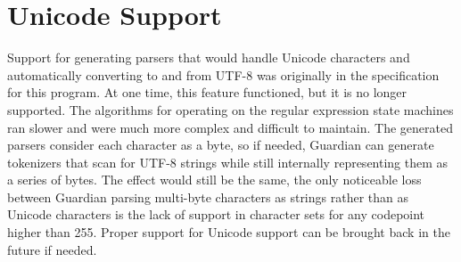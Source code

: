 
\section{Unicode Support}
{
	Support for generating parsers that would
	handle Unicode characters and automatically
	converting to and from UTF-8 was originally in the
	specification for this program.
	At one time, this feature functioned, but it
	is no longer supported.
	The algorithms for operating on the regular expression
	state machines ran slower and were
	much more complex and difficult to maintain.
	The generated parsers consider each
	character as a byte, so if needed,
	Guardian can generate tokenizers that scan
	for UTF-8 strings while still internally representing them as a series
	of bytes. The effect would still be the same, the only noticeable loss
	between Guardian parsing multi-byte characters as strings rather than
	as Unicode characters is the lack of support in character sets
	for any codepoint higher than 255.
	Proper support for Unicode support can be brought back in the
	future if needed.
}

